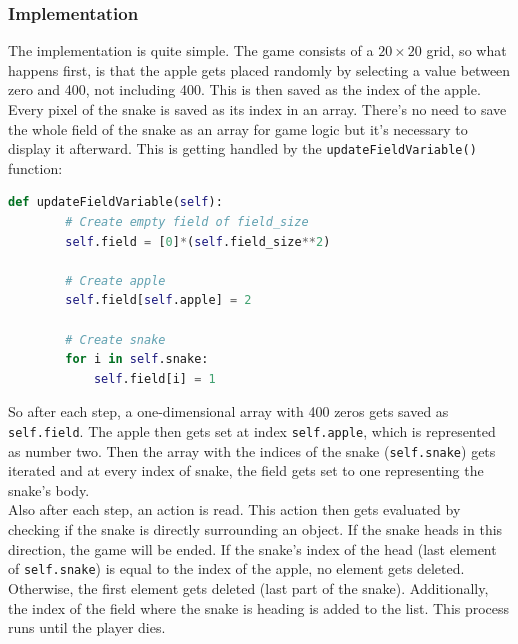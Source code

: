\documentclass[12pt]{article}
\begin{document}
\subsubsection{Implementation}\label{ssec:snakeimplementation}
The implementation is quite simple. The game consists of a $20{\times}20$ grid, so what happens first, is that the apple gets placed randomly by selecting a value between zero and 400, not including 400. This is then saved as the index of the apple. \\
Every pixel of the snake is saved as its index in an array. There's no need to save the whole field of the snake as an array for game logic but it's necessary to display it afterward. This is getting handled by the \lstinline{updateFieldVariable()} function:
\begin{lstlisting}[language=Python, caption=Example - Create a snake field every second of size \lstinline{self.field_size}]
    def updateFieldVariable(self):
        # Create empty field of field_size
        self.field = [0]*(self.field_size**2)

        # Create apple
        self.field[self.apple] = 2
        
        # Create snake
        for i in self.snake:
            self.field[i] = 1
\end{lstlisting}
So after each step, a one-dimensional array with 400 zeros gets saved as \lstinline{self.field}. The apple then gets set at index \lstinline{self.apple}, which is represented as number two. Then the array with the indices of the snake (\lstinline{self.snake}) gets iterated and at every index of snake, the field gets set to one representing the snake's body. \\
Also after each step, an action is read. This action then gets evaluated by checking if the snake is directly surrounding an object. If the snake heads in this direction, the game will be ended. If the snake's index of the head (last element of \lstinline{self.snake}) is equal to the index of the apple, no element gets deleted. Otherwise, the first element gets deleted (last part of the snake). Additionally, the index of the field where the snake is heading is added to the list. This process runs until the player dies.
\end{document}
